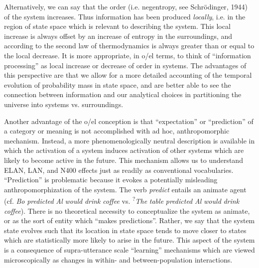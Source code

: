 Alternatively, we can say that the order (i.e. negentropy, see Schrödinger, 1944) of the system increases. Thus information has been produced \textit{locally}, i.e. in the region of state space which is relevant to describing the system. This local increase is always offset by an increase of entropy in the surroundings, and according to the second law of thermodynamics is always greater than or equal to the local decrease. It is more appropriate, in o/el terms, to think of “information processing” as local increase or decrease of order in systems. The advantages of this perspective are that we allow for a more detailed accounting of the temporal evolution of probability mass in state space, and are better able to see the connection between information and our analytical choices in partitioning the universe into systems vs. surroundings. 

Another advantage of the o/el conception is that “expectation” or “prediction” of a category or meaning is not accomplished with ad hoc, anthropomorphic mechanism. Instead, a more phenomenologically neutral description is available in which the activation of a system induces activation of other systems which are likely to become active in the future. This mechanism allows us to understand ELAN, LAN, and N400 effects just as readily as conventional vocabularies. “Prediction” is problematic because it evokes a potentially misleading anthropomorphization of the system. The verb \textit{predict} entails an animate agent (cf. \textit{Bo} \textit{predicted} \textit{Al} \textit{would} \textit{drink} \textit{coffee} vs. \textsuperscript{?}\textit{The} \textit{table} \textit{predicted} \textit{Al} \textit{would} \textit{drink} \textit{coffee}). There is no theoretical necessity to conceptualize the system as animate, or as the sort of entity which “makes predictions”. Rather, we say that the system state evolves such that its location in state space tends to move closer to states which are statistically more likely to arise in the future. This aspect of the system is a consequence of supra-utterance scale “learning” mechanisms which are viewed microscopically as changes in within- and between-population interactions.

